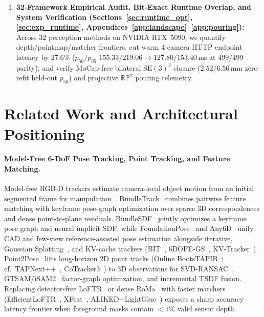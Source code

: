 \documentclass{evidencescene}
\begin{document}
\begin{enumerate}
    \item \textbf{32-Framework Empirical Audit, Bit-Exact Runtime Overlap, and System Verification (Sections~\ref{sec:runtime_opt}, \ref{sec:exp_runtime}, Appendices~\ref{app:landscape}--\ref{app:pouring}):} Across 32 perception methods on NVIDIA RTX~5090, we quantify depth/pointmap/matcher frontiers, cut warm 4-camera HTTP endpoint latency by $27.6\%$ ($p_{50}/p_{95}$ $155.33/219.06\to 127.80/153.40\,\mathrm{ms}$ at $499/499$ parity), and verify MoCap-free bilateral $\mathrm{SE}(3)^3$ closure ($2.52/6.56\,\mathrm{mm}$ zero-refit held-out $p_{50}$) and projective $\mathbb{RP}^2$ pouring telemetry.
\end{enumerate}

\section{Related Work and Architectural Positioning}
\label{sec:related}

\paragraph{Model-Free 6-DoF Pose Tracking, Point Tracking, and Feature Matching.} Model-free RGB-D trackers estimate camera-local object motion from an initial segmented frame for manipulation~\cite{zhao2023learning,chi2023diffusion}. BundleTrack~\cite{bundletrack} combines pairwise feature matching with keyframe pose-graph optimization over sparse 3D correspondences and dense point-to-plane residuals. BundleSDF~\cite{bundlesdf} jointly optimizes a keyframe pose graph and neural implicit SDF, while FoundationPose~\cite{foundationpose} and Any6D~\cite{lee2025any6d} unify CAD and few-view reference-assisted pose estimation alongside iterative, Gaussian Splatting~\cite{kerbl20233dgs,matsuki2024monogs,keetha2024splatam}, and KV-cache trackers (BIT~\cite{song2025bit}, 6DOPE-GS~\cite{jin20256dopegs}, KV-Tracker~\cite{elich2026kvtracker}). Point2Pose~\cite{point2pose} lifts long-horizon 2D point tracks (Online BootsTAPIR~\cite{bootstap}; cf.\ TAPNext++~\cite{zholus2025tapnext}, CoTracker3~\cite{karaev2024cotracker3}) to 3D observations for SVD-RANSAC~\cite{fischler1981ransac,umeyama1991least}, GTSAM/iSAM2~\cite{gtsam,kaess2012isam2} factor-graph optimization, and incremental TSDF fusion. Replacing detector-free LoFTR~\cite{loftr} or dense RoMa~\cite{edstedt2024roma} with faster matchers (EfficientLoFTR~\cite{eloftr}, XFeat~\cite{xfeat}, ALIKED+LightGlue~\cite{aliked,lightglue}) exposes a sharp accuracy--latency frontier when foreground masks contain $<1\%$ valid sensor depth.
\end{document}
